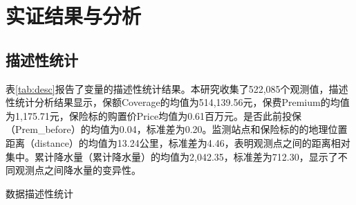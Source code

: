 \chapter{实证结果与分析}\label{chap:4}
\section{描述性统计}

表\ref{tab:desc}报告了变量的描述性统计结果。本研究收集了522,085个观测值，描述性统计分析结果显示，保额Coverage的均值为514,139.56元，保费Premium的均值为1,175.71元，保险标的购置价Price均值为0.61百万元。是否此前投保（Prem\_before）的均值为0.04，标准差为0.20。监测站点和保险标的的地理位置距离（distance）的均值为13.24公里，标准差为4.46，表明观测点之间的距离相对集中。累计降水量（累计降水量）的均值为2,042.35，标准差为712.30，显示了不同观测点之间降水量的变异性。

\begin{table}[H]
    \caption{数据描述性统计}\label{tab:desc}
    \centering
    
\end{table}

